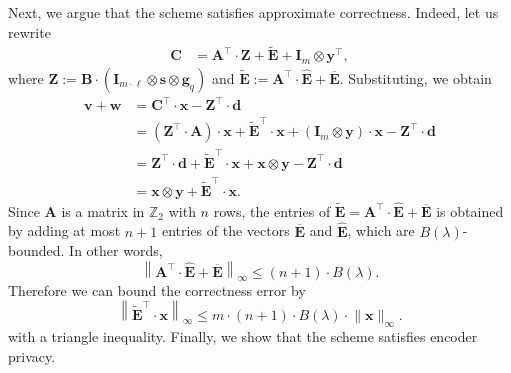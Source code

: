 \documentclass{theoretics}
\newcommand{\Z}{\mathbb{Z}}
\renewcommand{\sec}{\ensuremath{\lambda}}
\newcommand{\id}{\ensuremath{\mathbf{I}}}
\begin{document}
Next, we argue that the scheme satisfies approximate correctness. Indeed, let us rewrite
\begin{align*}
    \mathbf{C}&=\mathbf{A}^\intercal \cdot \mathbf{Z}+ \mathbf{\widetilde{E}}+ \id_{m} \otimes \mathbf{y}^\intercal,
\end{align*}
where $\mathbf{Z}:=\mathbf{B}\cdot (\id_{m\cdot \ell}\otimes \mathbf{s}\otimes \mathbf{g}_q)$ and $\mathbf{\widetilde{E}}:=\mathbf{A}^\intercal\cdot \hat{\mathbf{E}}+ \overline{\mathbf{E}}$. Substituting,  we obtain
\begin{align*}
\mathbf{v}+\mathbf{w}&=\mathbf{C}^\intercal \cdot \mathbf{x}-\mathbf{Z}^\intercal \cdot \mathbf{d}\\
&=(\mathbf{Z}^\intercal \cdot \mathbf{A})\cdot \mathbf{x}+\mathbf{\widetilde{E}}^\intercal\cdot \mathbf{x}+(\id_{m} \otimes \mathbf{y})\cdot \mathbf{x}-\mathbf{Z}^\intercal \cdot \mathbf{d}\\
&=\mathbf{Z}^\intercal \cdot \mathbf{d}+\mathbf{\widetilde{E}}^\intercal\cdot \mathbf{x}+\mathbf{x} \otimes \mathbf{y}-\mathbf{Z}^\intercal \cdot \mathbf{d}\\
&=\mathbf{x} \otimes \mathbf{y}+\mathbf{\widetilde{E}}^\intercal\cdot \mathbf{x}.
\end{align*}
Since $\mathbf{A}$ is a matrix in $\Z_2$ with $n$ rows, the entries of $\mathbf{\widetilde{E}}=\mathbf{A}^\intercal\cdot \hat{\mathbf{E}}+\overline{\mathbf{E}}$ is obtained by adding at most $n+1$ entries of the vectors $\overline{\mathbf{E}}$ and $\hat{\mathbf{E}}$, which are $B(\sec)$-bounded. In other words, \[\left\lVert \mathbf{A}^\intercal \cdot \hat{\mathbf{E}}+\overline{\mathbf{E}}\right\rVert_\infty\le (n+1)\cdot B(\sec).\] 
Therefore we can bound the correctness error by 
\begin{equation}\label{eq:alpha_correct}
\left\lVert\mathbf{\widetilde{E}}^\intercal\cdot \mathbf{x}\right\rVert_\infty\le m\cdot (n+1) \cdot B(\sec)\cdot \lVert \mathbf{x}\rVert_\infty.
\end{equation}
with a triangle inequality. Finally, we show that the scheme satisfies encoder privacy.
\end{document}
